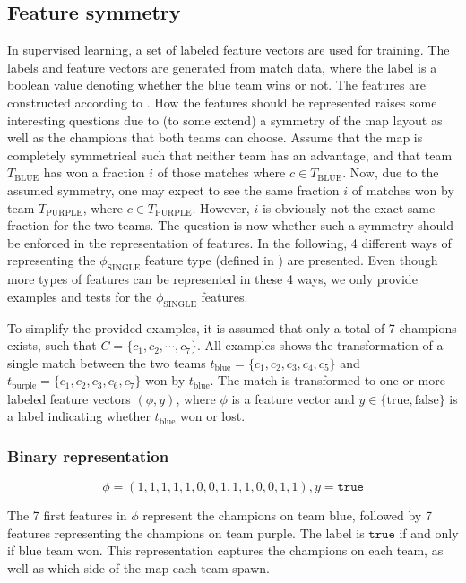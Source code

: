 \subsection{Feature symmetry}
\label{sec:representationoffeatures}
In supervised learning, a set of labeled feature vectors are used for training.
The labels and feature vectors are generated from match data, where the label is a boolean value denoting whether the blue team wins or not.
The features are constructed according to .
How the features should be represented raises some interesting questions due to (to some extend) a symmetry of the map layout as well as the champions that both teams can choose. Assume that the map is completely symmetrical such that neither team has an advantage, and that team $T_\text{BLUE}$ has won a fraction $i$ of those matches where $c \in T_\text{BLUE}$.
Now, due to the assumed symmetry, one may expect to see the same fraction $i$ of matches won by team $T_\text{PURPLE}$, where $c \in T_\text{PURPLE}$.
However, $i$ is obviously not the exact same fraction for the two teams. The question is now whether such a symmetry should be enforced in the representation of features.
In the following, 4 different ways of representing the $\phi_\text{SINGLE}$ feature type (defined in ) are presented.
Even though more types of features can be represented in these 4 ways, we only provide examples and tests for the $\phi_\text{SINGLE}$ features.

To simplify the provided examples, it is assumed that only a total of 7 champions exists, such that $C = \{c_1, c_2, \cdots, c_7\}$.
All examples shows the transformation of a single match between the two teams $t_\text{blue} = \{c_1,c_2,c_3,c_4,c_5\}$ and $t_\text{purple} = \{c_1,c_2,c_3,c_6,c_7\}$ won by $t_\text{blue}$. The match is transformed to one or more labeled feature vectors $(\phi, y)$, where $\phi$ is a feature vector and $y \in \{\text{true}, \text{false}\}$ is a label indicating whether $t_\text{blue}$ won or lost.

\subsubsection{Binary representation}

\[ \phi = (1,1,1,1,1,0,0,1,1,1,0,0,1,1), y = \texttt{true} \]

The 7 first features in $\phi$ represent the champions on team blue, followed by 7 features representing the champions on team purple. The label is $\texttt{true}$ if and only if blue team won.
This representation captures the champions on each team, as well as which side of the map each team spawn.

